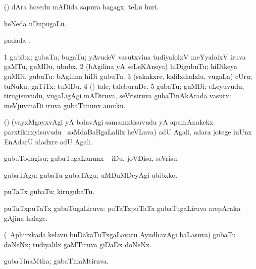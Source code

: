 \bentry
{}
\gl{\nA}
\bmng
(\nw) dAra hosedu mADida sapura hagagx, teLu huri. 
\emng
\eentry

\bentry
{}
\gl{\nA}
\bmng
heNeda uDupugaLu. 
\emng
\eentry

\bentry
{}
\gl{\nA}
\bmng
{} padada \bava. 
\emng
\eentry

\bentry
{}
\gl{\nA}
\bmng
\bnum
\num{1} gubibx; gubaTu; bugaTu; yAvudeV vasutxvina tudiyalolxV meYyalolxV iruva gaMTu, guMDu, ububx. 
\num{2} (bAgilina yA seLeKAneya) hiDigubuTu; hiDikeya guMDi, gubuTu:  bAgilina hiDi gubuTu. 
\num{3} (sakakxre, kalilxdadxlu, \mo vugaLa) cUru; tuNuku; gaTiTx; tuMDu. 
\num{4} (\ashi) tale; taleburuDe. 
\num{5} gubaTu; guMDi; eLeyuvudu, tirugisuvudu, \mo vugaLigAgi mADiruva, seVrisiruva gubaTinAkArada vasutx:  meVjuvinaDi iruva gubaTanunx amuku. 
\enum
\emng

\noindent
\gl{\nuga}
\bmng
{} (\ashi) (vayxMgayxvAgi yA balavAgi samamxtisuvudu yA apamAnakekx parxtikirxyisuvudu \mo\ saMdaBaRgaLalilx heVLuva) adU Agali, adara jotege inUnx EnAdarU idadxre adU Agali. 
\emng
\eentry

\bentry
{}
\gl{\kirx}


\noindent
\gl{\sakirx}
\bmng
gubuTodagisu; gubuTugaLanunx -- iDu, joVDisu, seVrisu. 
\emng

\noindent
\gl{\akirx}
\bmng
gubaTAgu; gubaTu gubaTAgu; uMDuMDeyAgi ubibxko. 
\emng
\eentry

\bentry
{}
\gl{\nA}
\bmng
puTaTx gubaTu; kirugubaTu. 
\emng
\eentry

\bentry
{}
\gl{\gu}
\bmng
puTaTxpuTaTx gubaTugaLiruva:  puTaTxpuTaTx gubaTugaLiruva arepAraka gAjina halage. 
\emng
\eentry

\bentry
{}
\gl{\nA}
\bmng
(\da\ Aphirxkada kelavu buDakaTuTxgaLavaru AyudhavAgi baLasuva) gubaTu doNeNx; tudiyalilx gaMTiruva giDaDx doNeNx.  
\emng
\eentry

\bentry
{}
\gl{\gu}
\bmng
gubaTinaMtha; gubaTinaMtiruva. 
\emng
\eentry

